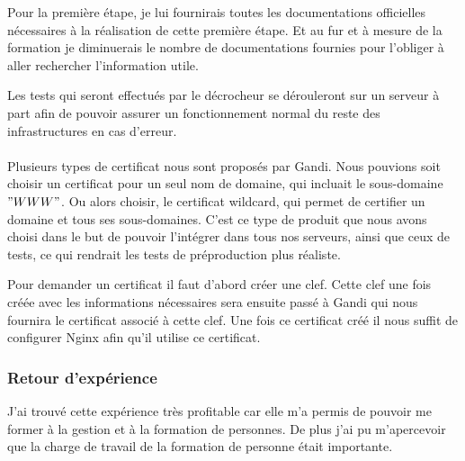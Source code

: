Pour la première étape, je lui fournirais toutes les documentations officielles nécessaires à la réalisation de cette première étape. Et au fur et à mesure de la formation je diminuerais le nombre de documentations fournies pour l'obliger à aller rechercher l'information utile.

Les tests qui seront effectués par le décrocheur se dérouleront sur un serveur à part afin de pouvoir assurer un fonctionnement normal du reste des infrastructures en cas d'erreur.\\\\

Plusieurs types de certificat nous sont proposés par Gandi. Nous pouvions soit choisir un certificat pour un seul nom de domaine, qui incluait le sous-domaine $"WWW"$. Ou alors choisir, le certificat wildcard, qui permet de certifier un domaine et tous ses sous-domaines. C'est ce type de produit que nous avons choisi dans le but de pouvoir l'intégrer dans tous nos serveurs, ainsi que ceux de tests, ce qui rendrait les tests de préproduction plus réaliste.

Pour demander un certificat il faut d'abord créer une clef. Cette clef une fois créée avec les informations nécessaires sera ensuite passé à Gandi qui nous fournira le certificat associé à cette clef. Une fois ce certificat créé il nous suffit de configurer Nginx afin qu'il utilise ce certificat.

\subsubsection{Retour d'expérience}

J'ai trouvé cette expérience très profitable car elle m'a permis de pouvoir me former à la gestion et à la formation de personnes. De plus j'ai pu m’apercevoir que la charge de travail de la formation de personne était importante.

